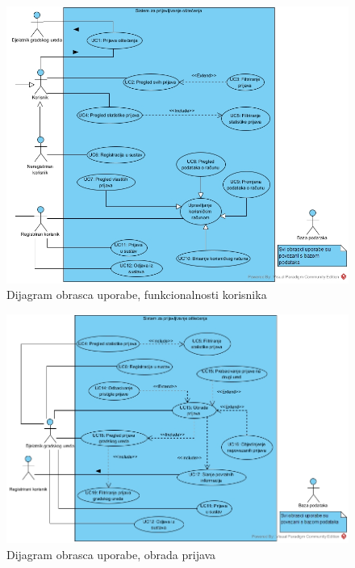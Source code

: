 					\begin{figure}[H]
						\includegraphics[width=\textwidth]{slike/Funkcionalnosti_korisnikaUCD.jpg} %
						\caption{Dijagram obrasca uporabe, funkcionalnosti korisnika}
						\label{fig:dijagramObrascaUporabe1} %
					\end{figure}
					
					\begin{figure}[H]
						\includegraphics[width=\textwidth]{slike/Obrada_prijavaUCD.jpg} %
						\caption{Dijagram obrasca uporabe, obrada prijava}
						\label{fig:dijagramObrascaUporabe2} %
					\end{figure}
					
